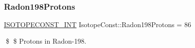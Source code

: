 \subsubsection{\texorpdfstring{Radon198\+Protons}{Radon198Protons}}
{\footnotesize\ttfamily \mbox{\hyperlink{group___isotope_const-_macros_ga5f18360b3e99483a35c32d789e62621c}{I\+S\+O\+T\+O\+P\+E\+C\+O\+N\+S\+T\+\_\+\+I\+NT}} Isotope\+Const\+::\+Radon198\+Protons = 86}

\$ \$ Protons in Radon-\/198. 